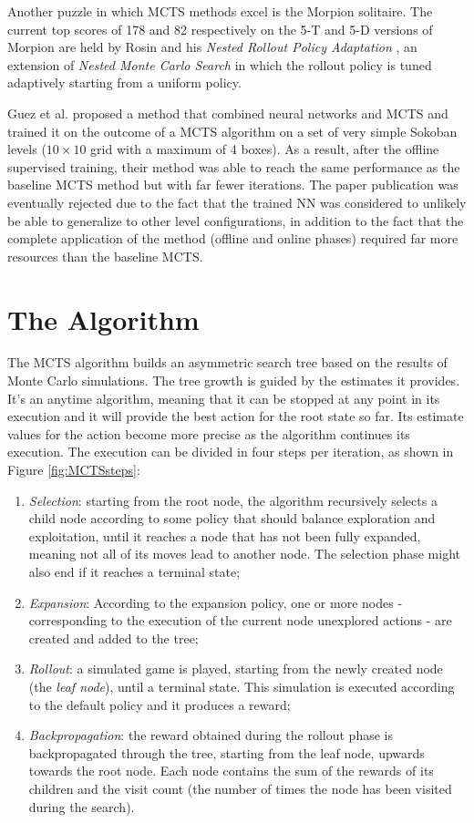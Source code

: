 \medskip\noindent
Another puzzle in which MCTS methods excel is the Morpion solitaire. The current top scores of 178 and 82 respectively on the 5-T and 5-D versions of Morpion are held by Rosin and his \textit{Nested Rollout Policy Adaptation} \cite{IJCAI113358}, an extension of \textit{Nested Monte Carlo Search} \cite{Cazenave2009} in which the rollout policy is tuned adaptively starting from a uniform policy.

\medskip\noindent
Guez et al. \cite{DBLP:journals/corr/abs-1802-04697} proposed a method that combined neural networks and MCTS and trained it on the outcome of a MCTS algorithm on a set of very simple Sokoban levels ($10\times 10$ grid with a maximum of 4 boxes). As a result, after the offline supervised training, their method was able to reach the same performance as the baseline MCTS method but with far fewer iterations. The paper publication was eventually rejected due to the fact that the trained NN was considered to unlikely be able to generalize to other level configurations, in addition to the fact that the complete application of the method (offline and online phases) required far more resources than the baseline MCTS.

\section{The Algorithm}\label{mctsalgorithm}
The MCTS algorithm builds an asymmetric search tree based on the results of Monte Carlo simulations. The tree growth is guided by the estimates it provides. It's an anytime algorithm, meaning that it can be stopped at any point in its execution and it will provide the best action for the root state so far. Its estimate values for the action become more precise as the algorithm continues its execution. The execution can be divided in four steps per iteration, as shown in Figure \ref{fig:MCTSsteps}:
\begin{enumerate}
    \item \textit{Selection}: starting from the root node, the algorithm recursively selects a child node according to some policy that should balance exploration and exploitation, until it reaches a node that has not been fully expanded, meaning not all of its moves lead to another node. The selection phase might also end if it reaches a terminal state;
    \item \textit{Expansion}: According to the expansion policy, one or more nodes - corresponding to the execution of the current node unexplored actions - are created and added to the tree;
    \item \textit{Rollout}: a simulated game is played, starting from the newly created node (the \textit{leaf node}), until a terminal state. This simulation is executed according to the default policy and it produces a reward;
    \item \textit{Backpropagation}: the reward obtained during the rollout phase is backpropagated through the tree, starting from the leaf node, upwards towards the root node. Each node contains the sum of the rewards of its children and the visit count (the number of times the node has been visited during the search).
\end{enumerate}

